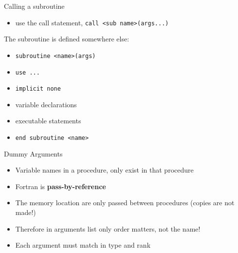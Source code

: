 \documentclass{beamer}
\begin{document}
\begin{frame}{Calling a subroutine}
  \begin{itemize}
    \item use the call statement, \texttt{call <sub name>(args...)}
  \end{itemize}
  \vfill
  The subroutine is defined somewhere else:
  \begin{itemize}
    \item \texttt{subroutine <name>(args)}
    \item \texttt{use ...}
    \item \texttt{implicit none}
    \item variable declarations
    \item executable statements
    \item \texttt{end subroutine <name>}
  \end{itemize}
\end{frame}
\begin{frame}{Dummy Arguments}

  \begin{itemize}
    \item Variable names in a procedure, only exist in that procedure
    \vfill\item Fortran is \textbf{pass-by-reference}
    \vfill\item The memory location are only passed between procedures (copies are not made!)
    \vfill\item Therefore in arguments list only order matters, not the name!
    \vfill\item Each argument must match in type and rank
  \end{itemize}

\end{frame}
\end{document}
